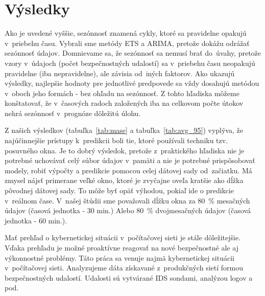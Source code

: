 \documentclass[thesismargins, thesislinespacing, openright, upjsfrontpage]{rnthesis}
\begin{document}
\section{Výsledky}

Ako je uvedené vyššie, sezónnosť znamená cykly, ktoré sa pravidelne opakujú v~priebehu času. Vybrali sme metódy ETS a ARIMA, pretože dokážu odrážať sezónnosť údajov. Domnievame sa, že sezónnosť sa nemusí brať do~úvahy, pretože vzory v~údajoch (počet bezpečnostných udalostí) sa v~priebehu času neopakujú pravidelne (iba nepravidelne), ale závisia od~iných faktorov. Ako ukazujú výsledky, najlepšie hodnoty pre jednotlivé predpovede sa vždy dosahujú metódou v~oboch jeho formách - bez ohľadu na sezónnosť. Z tohto hľadiska môžeme konštatovať, že v~časových radoch založených iba na celkovom počte útokov nehrá sezónnosť v~prognóze dôležitú úlohu.

Z našich výsledkov (tabuľka~\ref{tab:mase} a tabuľka~\ref{tab:avg_95}) vyplýva, že najúčinnejšie prístupy k~predikcii boli tie, ktoré používali techniku tzv. posuvného okna. Je to dobrý výsledok, pretože z~praktického hľadiska nie je potrebné uchovávať celý súbor údajov v~pamäti a nie je potrebné prispôsobovať modely, robiť výpočty a predikcie pomocou celej dátovej sady od~začiatku. Má zmysel nájsť primerane veľké okno, ktoré je zvyčajne oveľa kratšie ako dĺžka pôvodnej dátovej sady. To môže byť opäť výhodou, pokiaľ ide o predikcie v~reálnom čase. V~našej štúdii sme považovali dĺžku okna za 80~\% mesačných údajov (časová jednotka - 30 min.) Alebo 80~\% dvojmesačných údajov (časová jednotka - 60 min.).


\zaver

Mať prehľad o kybernetickej situácii v~počítačovej sieti je stále dôležitejšie. Vďaka prehľadu je možné proaktívne reagovať na nové bezpečnostné ale aj výkonnostné problémy. Táto práca sa venuje najmä kybernetickej situácii v~počítačovej sieti. Analyzujeme dáta získavané z~produkčných sietí formou bezpečnostných udalostí. Udalosti sú vytvárané IDS sondami, analýzou logov a pod. 
\end{document}
